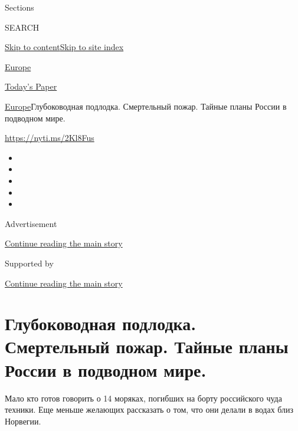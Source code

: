 Sections

SEARCH

\protect\hyperlink{site-content}{Skip to
content}\protect\hyperlink{site-index}{Skip to site index}

\href{https://www.nytimes.com/section/world/europe}{Europe}

\href{https://myaccount.nytimes.com/auth/login?response_type=cookie\&client_id=vi}{}

\href{https://www.nytimes.com/section/todayspaper}{Today's Paper}

\href{/section/world/europe}{Europe}\textbar{}Глубоководная подлодка.
Смертельный пожар. Тайные планы России в подводном мире.

\url{https://nyti.ms/2Kl8Fus}

\begin{itemize}
\item
\item
\item
\item
\item
\end{itemize}

Advertisement

\protect\hyperlink{after-top}{Continue reading the main story}

Supported by

\protect\hyperlink{after-sponsor}{Continue reading the main story}

\hypertarget{ux433ux43bux443ux431ux43eux43aux43eux432ux43eux434ux43dux430ux44f-ux43fux43eux434ux43bux43eux434ux43aux430-ux441ux43cux435ux440ux442ux435ux43bux44cux43dux44bux439-ux43fux43eux436ux430ux440-ux442ux430ux439ux43dux44bux435-ux43fux43bux430ux43dux44b-ux440ux43eux441ux441ux438ux438-ux432-ux43fux43eux434ux432ux43eux434ux43dux43eux43c-ux43cux438ux440ux435}{%
\section{Глубоководная подлодка. Смертельный пожар. Тайные планы России
в подводном
мире.}\label{ux433ux43bux443ux431ux43eux43aux43eux432ux43eux434ux43dux430ux44f-ux43fux43eux434ux43bux43eux434ux43aux430-ux441ux43cux435ux440ux442ux435ux43bux44cux43dux44bux439-ux43fux43eux436ux430ux440-ux442ux430ux439ux43dux44bux435-ux43fux43bux430ux43dux44b-ux440ux43eux441ux441ux438ux438-ux432-ux43fux43eux434ux432ux43eux434ux43dux43eux43c-ux43cux438ux440ux435}}

Мало кто готов говорить о 14 моряках, погибших на борту российского чуда
техники. Еще меньше желающих рассказать о том, что они делали в водах
близ Норвегии.

